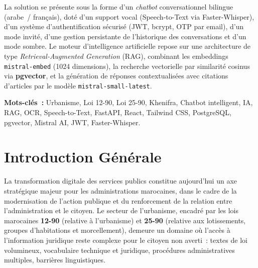 \documentclass[12pt,a4paper]{report}
\begin{document}
La solution se présente sous la forme d'un \textit{chatbot} conversationnel bilingue (arabe~/ français), doté d'un support vocal (Speech-to-Text via Faster-Whisper), d'un système d'authentification sécurisé (JWT, bcrypt, OTP par email), d'un mode invité, d'une gestion persistante de l'historique des conversations et d'un mode sombre. Le moteur d'intelligence artificielle repose sur une architecture de type \textit{Retrieval-Augmented Generation} (RAG), combinant les embeddings \texttt{mistral-embed} (1024 dimensions), la recherche vectorielle par similarité cosinus via \textbf{pgvector}, et la génération de réponses contextualisées avec citations d'articles par le modèle \texttt{mistral-small-latest}.

\vspace{0.4cm}
\noindent\textbf{Mots-clés~:} Urbanisme, Loi 12-90, Loi 25-90, Khenifra, Chatbot intelligent, IA, RAG, OCR, Speech-to-Text, FastAPI, React, Tailwind CSS, PostgreSQL, pgvector, Mistral AI, JWT, Faster-Whisper.



\tableofcontents
\listoffigures
\listoftables


\clearpage
{}
\setcounter{savepage}{\value{page}}
\setcounter{page}{\value{savepage}}

\chapter*{Introduction Générale}

La transformation digitale des services publics constitue aujourd'hui un axe stratégique majeur pour les administrations marocaines, dans le cadre de la modernisation de l'action publique et du renforcement de la relation entre l'administration et le citoyen. Le secteur de l'urbanisme, encadré par les lois marocaines \textbf{12-90} (relative à l'urbanisme) et \textbf{25-90} (relative aux lotissements, groupes d'habitations et morcellement), demeure un domaine où l'accès à l'information juridique reste complexe pour le citoyen non averti~: textes de loi volumineux, vocabulaire technique et juridique, procédures administratives multiples, barrières linguistiques.
\end{document}
